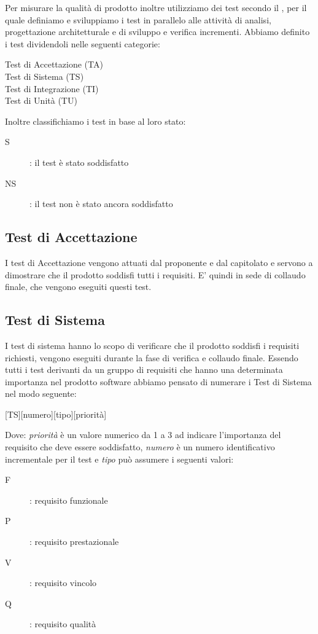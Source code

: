 \documentclass[../piano-di-qualifica.tex]{subfiles}
\begin{document}
Per misurare la qualità di prodotto inoltre utilizziamo dei test secondo il , per il quale definiamo e sviluppiamo i test in parallelo alle attività di analisi, progettazione architetturale e di sviluppo e verifica incrementi.
Abbiamo definito i test dividendoli nelle seguenti categorie:
\begin{description}
  \item [Test di Accettazione (TA)]
  \item [Test di Sistema (TS)]
  \item [Test di Integrazione (TI)]
  \item [Test di Unità (TU)]
\end{description}

Inoltre classifichiamo i test in base al loro stato:
\begin{description}
  \item [S]: il test è stato soddisfatto
  \item [NS]: il test non è stato ancora soddisfatto
\end{description}

\subsection{Test di Accettazione}%
\label{sub:test_di_accettazione}

I test di Accettazione vengono attuati dal proponente e dal capitolato e servono a dimostrare che il prodotto soddisfi tutti i requisiti.
E' quindi in sede di collaudo finale, che vengono eseguiti questi test.

\subsection{Test di Sistema}%
\label{sub:test_di_sistema}

I test di sistema hanno lo scopo di verificare che il prodotto soddisfi i requisiti richiesti, vengono eseguiti durante la fase di verifica e collaudo finale.
Essendo tutti i test derivanti da un gruppo di requisiti che hanno una determinata importanza nel prodotto software abbiamo pensato di numerare i Test di Sistema nel modo seguente:
\begin{center}
  [TS][numero][tipo][priorità]
\end{center}

Dove: \textit{priorità} è un valore numerico da 1 a 3 ad indicare l'importanza del requisito che deve essere soddisfatto, \textit{numero} è un numero identificativo incrementale per il test e \textit{tipo} può assumere i seguenti valori:
\begin{description}
  \item [F]: requisito funzionale
  \item [P]: requisito prestazionale
  \item [V]: requisito vincolo
  \item [Q]: requisito qualità
\end{description}
\end{document}
